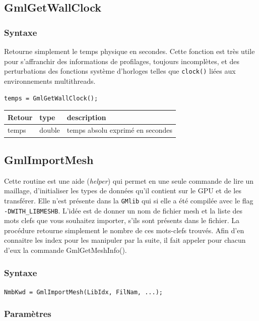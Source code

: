 \documentclass[a4paper,12pt]{article}
\begin{document}
\subsection{GmlGetWallClock}

\subsubsection*{Syntaxe}

Retourne simplement le temps physique en secondes.
Cette fonction est très utile pour s'affranchir des informations de profilages, toujours incomplètes, et des perturbations des fonctions système d'horloges telles que {\tt clock()} liées aux environnements multithreads.

{\tt temps = GmlGetWallClock();}

\begin{tabular}{|m{2cm}|m{1.5cm}|m{10.5cm}|}
\hline
Retour     & type    & description \\
\hline
temps      & double & temps absolu exprimé en secondes\\
\hline
\end{tabular}


\subsection{GmlImportMesh}

Cette routine est une aide (\emph{helper}) qui permet en une seule commande de lire un maillage, d'initialiser les types de données qu'il contient sur le GPU et de les transférer.
Elle n'est présente dans la {\tt GMlib} qui si elle a été compilée avec le flag {\tt -DWITH\_LIBMESHB}.
L'idée est de donner un nom de fichier mesh et la liste des mots clefs que vous souhaitez importer, s'ils sont présents dans le fichier.
La procédure retourne simplement le nombre de ces mots-clefs trouvés.
Afin d'en connaitre les index pour les manipuler par la suite, il fait appeler pour chacun d'eux la commande GmlGetMeshInfo().

\subsubsection*{Syntaxe}

{\tt NmbKwd = GmlImportMesh(LibIdx, FilNam, ...);}

\subsubsection*{Paramètres}
\end{document}

